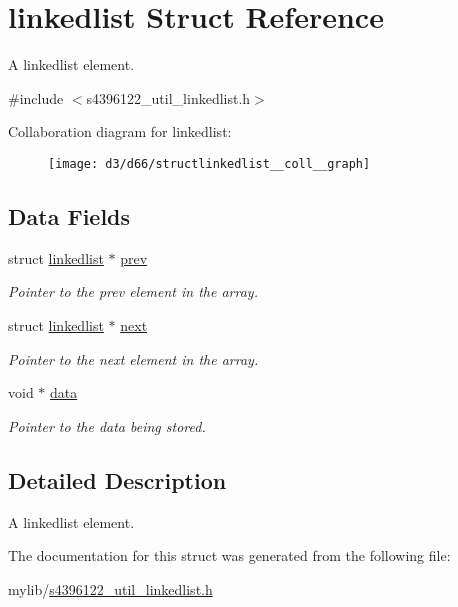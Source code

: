 \hypertarget{structlinkedlist}{}\section{linkedlist Struct Reference}
\label{structlinkedlist}


A linkedlist element.  




{\ttfamily \#include $<$s4396122\+\_\+util\+\_\+linkedlist.\+h$>$}



Collaboration diagram for linkedlist\+:\nopagebreak
\begin{figure}[H]
\begin{center}
\leavevmode
\texttt{[image: d3/d66/structlinkedlist\_\_coll\_\_graph]}
\end{center}
\end{figure}
\subsection*{Data Fields}
\begin{DoxyCompactItemize}
\item 
struct \hyperlink{structlinkedlist}{linkedlist} $\ast$ \hyperlink{structlinkedlist_acfe28edfbfca94248d2552a19efbd2a6}{prev}\hypertarget{structlinkedlist_acfe28edfbfca94248d2552a19efbd2a6}{}\label{structlinkedlist_acfe28edfbfca94248d2552a19efbd2a6}

\begin{DoxyCompactList}\small\item\em Pointer to the prev element in the array. \end{DoxyCompactList}\item 
struct \hyperlink{structlinkedlist}{linkedlist} $\ast$ \hyperlink{structlinkedlist_a1cd8b31b9e357b1b2b4b862eeca6863c}{next}\hypertarget{structlinkedlist_a1cd8b31b9e357b1b2b4b862eeca6863c}{}\label{structlinkedlist_a1cd8b31b9e357b1b2b4b862eeca6863c}

\begin{DoxyCompactList}\small\item\em Pointer to the next element in the array. \end{DoxyCompactList}\item 
void $\ast$ \hyperlink{structlinkedlist_aa70dbbff6bbb175200391df764e46d1c}{data}\hypertarget{structlinkedlist_aa70dbbff6bbb175200391df764e46d1c}{}\label{structlinkedlist_aa70dbbff6bbb175200391df764e46d1c}

\begin{DoxyCompactList}\small\item\em Pointer to the data being stored. \end{DoxyCompactList}\end{DoxyCompactItemize}


\subsection{Detailed Description}
A linkedlist element. 

The documentation for this struct was generated from the following file\+:\begin{DoxyCompactItemize}
\item 
mylib/\hyperlink{s4396122__util__linkedlist_8h}{s4396122\+\_\+util\+\_\+linkedlist.\+h}\end{DoxyCompactItemize}
